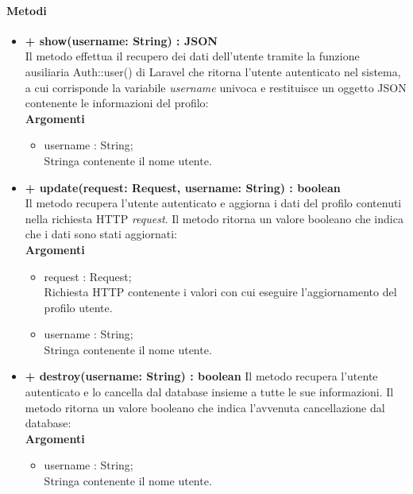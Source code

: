 	\paragraph{Metodi}
		\begin{itemize}
			\item \textbf{+ show(username: String) : JSON}\\
			Il metodo effettua il recupero dei dati dell'utente tramite la funzione ausiliaria Auth::user() di \gls{Laravel} che ritorna l'utente autenticato nel sistema, a cui corrisponde la variabile \textit{username} univoca e restituisce un oggetto \gls{JSON} contenente le informazioni del profilo:\\
			\textbf{Argomenti}
			\begin{itemize}
				\item username : String;\\
				Stringa contenente il nome utente.
			\end{itemize}
			
			\item \textbf{+ update(request: Request, username: String) : boolean}\\
			Il metodo recupera l'utente autenticato e aggiorna i dati del profilo contenuti nella richiesta HTTP \textit{request}. Il metodo ritorna un valore booleano che indica che i dati sono stati aggiornati:\\
			\textbf{Argomenti}
			\begin{itemize}
				\item request : Request;\\
				Richiesta HTTP contenente i valori con cui eseguire l'aggiornamento del profilo utente.
				\item username : String;\\
				Stringa contenente il nome utente.
			\end{itemize}
			
			\item \textbf{+ destroy(username: String) : boolean}
			Il metodo recupera l'utente autenticato e lo cancella dal \gls{database} insieme a tutte le  sue informazioni. Il metodo ritorna un valore booleano che indica l'avvenuta cancellazione dal \gls{database}:\\
			\textbf{Argomenti}
			\begin{itemize}
				\item username : String;\\
				Stringa contenente il nome utente.
			\end{itemize}
			

\end{itemize}
